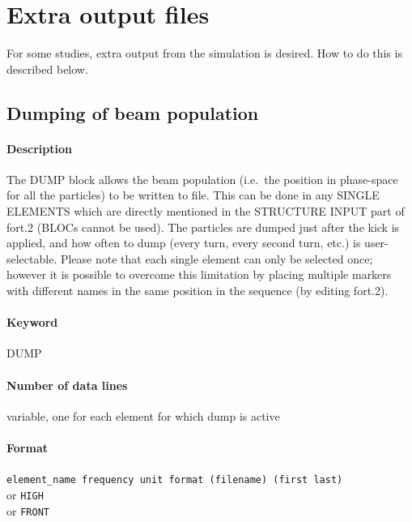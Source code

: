 \documentclass[a4paper,11pt]{report}
\begin{document}
\section{Extra output files}
For some studies, extra output from the simulation is desired.
How to do this is described below.

\subsection{Dumping of beam population} \label{sec:DUMP}

\paragraph{Description}
The DUMP block allows the beam population (i.e.\ the position in phase-space for all the particles) to be written to file.
This can be done in any SINGLE ELEMENTS which are directly mentioned in the STRUCTURE INPUT part of fort.2 (BLOCs cannot be used).
The particles are dumped just after the kick is applied, and how often to dump (every turn, every second turn, etc.) is user-selectable.
Please note that each single element can only be selected once; however it is possible to overcome this limitation by placing multiple markers with different names in the same position in the sequence (by editing fort.2).

\paragraph{Keyword}
DUMP

\paragraph{Number of data lines}
variable, one for each element for which dump is active

\paragraph{Format}
\texttt{element\_name frequency unit format (filename) (first last)}\\
or \texttt{HIGH}\\
or \texttt{FRONT}
\end{document}
